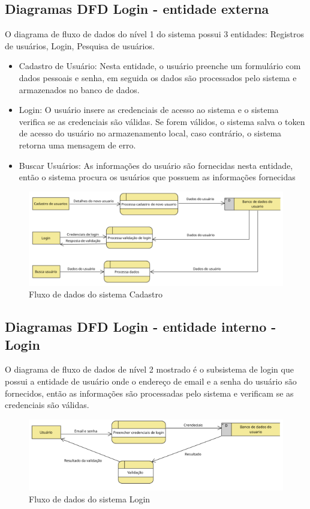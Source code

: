 \subsection{Diagramas DFD Login - entidade externa}
O diagrama de fluxo de dados do nível 1 do sistema possui 3 entidades: Registros de usuários, Login, Pesquisa de usuários.
\begin{itemize}
  \item Cadastro de Usuário: Nesta entidade, o usuário preenche um formulário com dados pessoais e senha, em seguida os dados são processados pelo sistema e armazenados no banco de dados.
  \item Login: O usuário insere as credenciais de acesso ao sistema e o sistema verifica se as credenciais são válidas. Se forem válidos, o sistema salva o token de acesso do usuário no armazenamento local, caso contrário, o sistema retorna uma mensagem de erro.
  \item Buscar Usuários: As informações do usuário são fornecidas nesta entidade, então o sistema procura os usuários que possuem as informações fornecidas

\end{itemize}

\begin{figure}[H]
  \begin{center}
      \includegraphics[width=12cm]{Pictures/diagram/loginNv1.png}
      \caption{Fluxo de dados do sistema Cadastro} \label{loginNV1}
    \end{center}
  \end{figure}

  \subsection{Diagramas DFD Login - entidade interno - Login}
  O diagrama de fluxo de dados de nível 2 mostrado é o subsistema de login que possui a entidade de usuário onde o endereço de email e a senha do usuário são fornecidos, então as informações são processadas pelo sistema e verificam se as credenciais são válidas.
  \begin{figure}[H]
    \begin{center}
        \includegraphics[width=12cm]{Pictures/diagram/loginNv2.png}
        \caption{Fluxo de dados do sistema Login} \label{loginNV2}
      \end{center}
    \end{figure}
